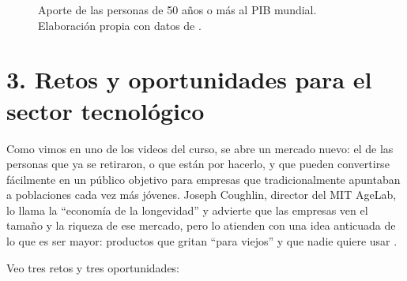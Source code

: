 \documentclass[11pt,letterpaper]{article}
\begin{document}
\begin{figure}[H]
\centering
{}
\caption{Aporte de las personas de 50 años o más al PIB mundial. Elaboración
propia con datos de \Textcite{aarp2022}.}
\label{fig:longevidad}
\end{figure}

\section*{3. Retos y oportunidades para el sector tecnológico}

Como vimos en uno de los videos del curso, se abre un mercado nuevo: el de las
personas que ya se retiraron, o que están por hacerlo, y que pueden convertirse
fácilmente en un público objetivo para empresas que tradicionalmente apuntaban
a poblaciones cada vez más jóvenes. Joseph Coughlin, director del MIT AgeLab,
lo llama la \enquote{economía de la longevidad} y advierte que las empresas
ven el tamaño y la riqueza de ese mercado, pero lo atienden con una idea
anticuada de lo que es ser mayor: productos que gritan \enquote{para viejos} y
que nadie quiere usar \parencite{coughlin2017}.

Veo tres retos y tres oportunidades:
\end{document}
